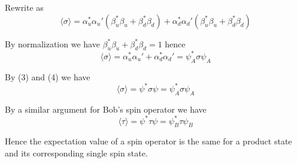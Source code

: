 Rewrite as
\begin{equation*}
\langle\sigma\rangle=\alpha_u^*\alpha_u'(\beta_u^*\beta_u+\beta_d^*\beta_d)
+\alpha_d^*\alpha_d'(\beta_u^*\beta_u+\beta_d^*\beta_d)
\end{equation*}

By normalization we have $\beta_u^*\beta_u+\beta_d^*\beta_d=1$ hence
\begin{equation*}
\langle\sigma\rangle=\alpha_u^*\alpha_u'+\alpha_d^*\alpha_d'=\psi_A^*\sigma\psi_A
\tag{4}
\end{equation*}

By (3) and (4) we have
\begin{equation*}
\langle\sigma\rangle=\psi^*\sigma\psi=\psi_A^*\sigma\psi_A
\end{equation*}

By a similar argument for Bob's spin operator we have
\begin{equation*}
\langle\tau\rangle=\psi^*\tau\psi=\psi_B^*\tau\psi_B
\end{equation*}

Hence the expectation value of a spin operator is the same for a product state and its
corresponding single spin state.


